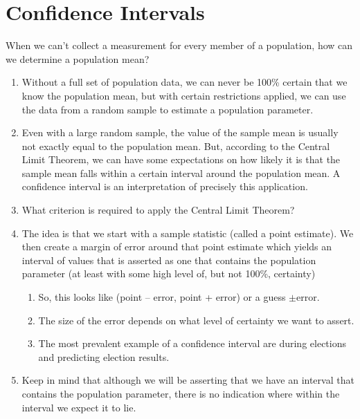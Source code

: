 \documentclass{article}
\begin{document}
\section*{Confidence Intervals}

When we can't collect a measurement for every member of a population, how can we determine a population mean?

\begin{enumerate}

    \item Without a full set of population data, we can never be 100\% certain that we know the population mean, but with certain restrictions applied, we can use the data from a random sample to estimate a population parameter.

    \item Even with a large random sample, the value of the sample mean is usually not exactly equal to the population mean. But, according to the Central Limit Theorem, we can have some expectations on how likely it is that the sample mean falls within a certain interval around the population mean. A confidence interval is an interpretation of precisely this application.

    \item What criterion is required to apply the Central Limit Theorem?

    \item The idea is that we start with a sample statistic (called a point estimate). We then create a margin of error around that point estimate which yields an interval of values that is asserted as one that contains the population parameter (at least with some high level of, but not 100\%, certainty)
    
    \begin{enumerate}
    
        \item So, this looks like (point -- error, point + error) or a guess $\pm$error.
        
        \item The size of the error depends on what level of certainty we want to assert.
        
        \item The most prevalent example of a confidence interval are during elections and predicting election results.
        
    \end{enumerate}
    
    \item Keep in mind that although we will be asserting that we have an interval that contains the population parameter, there is no indication where within the interval we expect it to lie.
    
\end{enumerate}
\end{document}
